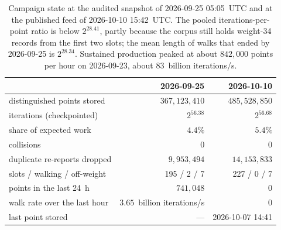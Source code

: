 \begin{table}[t]
\centering
\small
\caption{Campaign state at the audited snapshot of 2026-09-25
  05:05~UTC and at the published feed of 2026-10-10 15:42~UTC. The pooled iterations-per-point ratio is below $2^{28.41}$, partly
  because the corpus still holds weight-34 records from the first two
  slots; the mean length of walks that ended by 2026-09-25 is
  $2^{28.34}$. Sustained production peaked at about $842{,}000$ points
  per hour on 2026-09-23, about $83$~billion iterations/s.}
\label{tab:state}
\begin{tabular}{@{}lrr@{}}
\toprule
 & 2026-09-25 & 2026-10-10 \\
\midrule
distinguished points stored & $367{,}123{,}410$ & $485{,}528{,}850$ \\
iterations (checkpointed) & $2^{56.38}$ & $2^{56.68}$ \\
share of expected work & $4.4\%$ & $5.4\%$ \\
collisions & 0 & 0 \\
duplicate re-reports dropped & $9{,}953{,}494$ & $14{,}153{,}833$ \\
slots / walking / off-weight & 195 / 2 / 7 & 227 / 0 / 7 \\
points in the last 24~h & $741{,}048$ & 0 \\
walk rate over the last hour & $3.65$~billion iterations/s & 0 \\
last point stored & --- & 2026-10-07 14:41 \\
\bottomrule
\end{tabular}
\end{table}
